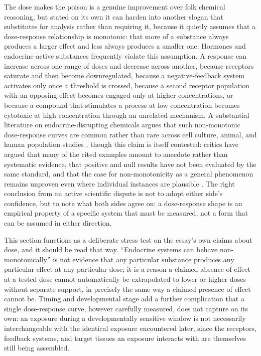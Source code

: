 \documentclass[11pt]{article}
\begin{document}
The dose makes the poison is a genuine improvement over folk chemical reasoning, but stated on its own it can harden into another slogan that substitutes for analysis rather than requiring it, because it quietly assumes that a dose-response relationship is monotonic: that more of a substance always produces a larger effect and less always produces a smaller one. Hormones and endocrine-active substances frequently violate this assumption. A response can increase across one range of doses and decrease across another, because receptors saturate and then become downregulated, because a negative-feedback system activates only once a threshold is crossed, because a second receptor population with an opposing effect becomes engaged only at higher concentrations, or because a compound that stimulates a process at low concentration becomes cytotoxic at high concentration through an unrelated mechanism. A substantial literature on endocrine-disrupting chemicals argues that such non-monotonic dose-response curves are common rather than rare across cell culture, animal, and human population studies \citep{vandenberg2012lowdose}, though this claim is itself contested: critics have argued that many of the cited examples amount to anecdote rather than systematic evidence, that positive and null results have not been evaluated by the same standard, and that the case for non-monotonicity as a general phenomenon remains unproven even where individual instances are plausible \citep{rhomberg2012lowdose}. The right conclusion from an active scientific dispute is not to adopt either side's confidence, but to note what both sides agree on: a dose-response shape is an empirical property of a specific system that must be measured, not a form that can be assumed in either direction.

This section functions as a deliberate stress test on the essay's own claims about dose, and it should be read that way. ``Endocrine systems can behave non-monotonically'' is not evidence that any particular substance produces any particular effect at any particular dose; it is a reason a claimed absence of effect at a tested dose cannot automatically be extrapolated to lower or higher doses without separate support, in precisely the same way a claimed presence of effect cannot be. Timing and developmental stage add a further complication that a single dose-response curve, however carefully measured, does not capture on its own: an exposure during a developmentally sensitive window is not necessarily interchangeable with the identical exposure encountered later, since the receptors, feedback systems, and target tissues an exposure interacts with are themselves still being assembled.
\end{document}
